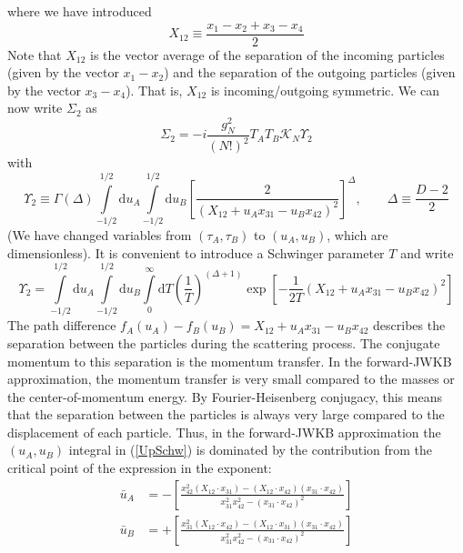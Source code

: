 where we have introduced
\begin{equation}
	X_{1 2} \equiv \frac{x_{1} - x_{2} + x_{3} - x_{4}}{2}
\end{equation}
Note that $X_{1 2}$ is the vector average of the separation of the incoming particles (given by the vector $x_{1} - x_{2}$) and the separation of the outgoing particles (given by the vector $x_{3} - x_{4}$). That is, $X_{12}$ is incoming/outgoing symmetric. We can now write $\Sigma_{2}$ as
\begin{equation}
	\Sigma_{2} = -i\frac{g_{N}^{2}}{(N!)^{2}} T_{A} T_{B} \mathcal{K}_{N} \Upsilon_{2}
\end{equation}
with
\begin{equation}
	\Upsilon_{2} \equiv \Gamma(\Delta) \int\limits_{-1/2}^{1/2}\mathrm{d}u_{A} \int\limits_{-1/2}^{1/2}\mathrm{d}u_{B} \left[ \frac{2}{(X_{1 2} + u_{A} x_{3 1} - u_{B} x_{4 2})^{2}} \right]^{\Delta}, \qquad \Delta \equiv \frac{D - 2}{2}
\end{equation}
(We have changed variables from $(\tau_{A}, \tau_{B})$ to $(u_{A}, u_{B})$, which are dimensionless). It is convenient to introduce a Schwinger parameter $T$ and write
\begin{equation}
	\Upsilon_{2} = \int\limits_{-1/2}^{1/2}\mathrm{d}u_{A} \int\limits_{-1/2}^{1/2}\mathrm{d}u_{B} \int\limits_{0}^{\infty}\mathrm{d}T \left( \frac{1}{T} \right)^{(\Delta + 1)} \exp{\left[- \frac{1}{2 T} (X_{1 2} + u_{A} x_{3 1} - u_{B} x_{4 2})^{2} \right]} \label{UpSchw}
\end{equation}
The path difference $f_{A}(u_{A}) - f_{B}(u_{B}) = X_{1 2} + u_{A} x_{3 1} - u_{B} x_{4 2}$ describes the separation between the particles during the scattering process. The conjugate momentum to this separation is the momentum transfer. In the forward-JWKB approximation, the momentum transfer is very small compared to the masses or the center-of-momentum energy. By Fourier-Heisenberg conjugacy, this means that the separation between the particles is always very large compared to the displacement of each particle. Thus, in the forward-JWKB approximation the $(u_{A}, u_{B})$ integral in (\ref{UpSchw}) is dominated by the contribution from the critical point of the expression in the exponent:
\begin{align}
	\bar{u}_{A} &= - \left[ \frac{x_{42}^{2} (X_{12} \cdot x_{31}) - (X_{12} \cdot x_{42})(x_{31} \cdot x_{42})}{x_{31}^{2} x_{42}^{2} - (x_{31} \cdot x_{42})^{2}} \right] \\
	\bar{u}_{B} &= + \left[ \frac{x_{31}^{2} (X_{12} \cdot x_{42}) - (X_{12} \cdot x_{31})(x_{31} \cdot x_{42})}{x_{31}^{2} x_{42}^{2} - (x_{31} \cdot x_{42})^{2}} \right]
\end{align}
